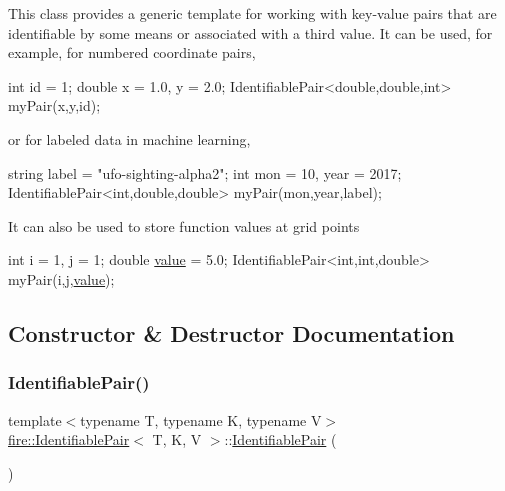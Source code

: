 This class provides a generic template for working with key-\/value pairs that are identifiable by some means or associated with a third value. It can be used, for example, for numbered coordinate pairs, 
\begin{DoxyCode}
\textcolor{keywordtype}{int} \textcolor{keywordtype}{id} = 1;
\textcolor{keywordtype}{double} x = 1.0, y = 2.0;
IdentifiablePair<double,double,int> myPair(x,y,\textcolor{keywordtype}{id});
\end{DoxyCode}
 or for labeled data in machine learning, 
\begin{DoxyCode}
\textcolor{keywordtype}{string} label = \textcolor{stringliteral}{"ufo-sighting-alpha2"};
\textcolor{keywordtype}{int} mon = 10, year = 2017;
IdentifiablePair<int,double,double> myPair(mon,year,label);
\end{DoxyCode}
 It can also be used to store function values at grid points 
\begin{DoxyCode}
\textcolor{keywordtype}{int} i = 1, j = 1;
\textcolor{keywordtype}{double} \hyperlink{a00772_a4aa238990585cb35d1902140ebe6fb9f}{value} = 5.0;
IdentifiablePair<int,int,double> myPair(i,j,\hyperlink{a00772_a4aa238990585cb35d1902140ebe6fb9f}{value});
\end{DoxyCode}
 

\subsection{Constructor \& Destructor Documentation}
\mbox{\label{a00772_a00a1d2e1fc20b2edf8e27dc3158d8826}} 
\subsubsection{\texorpdfstring{Identifiable\+Pair()}{IdentifiablePair()}\hspace{0.1cm}{\footnotesize\ttfamily [1/2]}}
{\footnotesize\ttfamily template$<$typename T, typename K, typename V$>$ \\
\hyperlink{a00772}{fire\+::\+Identifiable\+Pair}$<$ T, K, V $>$\+::\hyperlink{a00772}{Identifiable\+Pair} (\begin{DoxyParamCaption}{ }\end{DoxyParamCaption})\hspace{0.3cm}{\ttfamily [inline]}}

